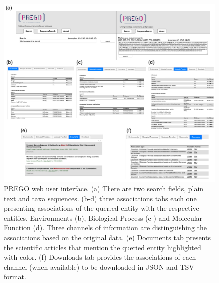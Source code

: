 \begin{figure}[h]
   \label{prego_ui}
   \centering
   \includegraphics[width=0.98\columnwidth]{figures/prego_ui.png}
   \caption{
      PREGO web user interface. 
      (a) There are two search fields, plain text and taxa sequences. 
      (b-d) three associations tabs each one presenting associations of the querred entity with the respective entities, Environments (b), Biological Process (c ) and Molecular Function (d). 
      Three channels of information are distinguishing the associations based on the original data. 
      (e) Documents tab presents the scientific articles that mention the queried entity highlighted with color. 
      (f) Downloads tab provides the associations of each channel (when available) to be downloaded in JSON and TSV format.
   }
\end{figure}





